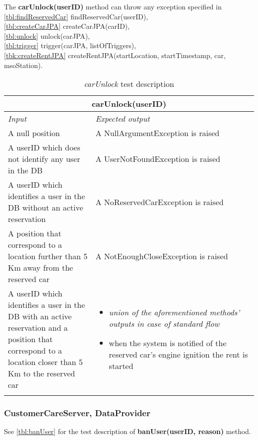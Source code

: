 \clearpage

The \textbf{carUnlock(userID)} method can throw any exception specified in \\\autoref{tbl:findReservedCar} findReservedCar(userID), \\\autoref{tbl:createCarJPA} createCarJPA(carID), \\\autoref{tbl:unlock} unlock(carJPA), \\\autoref{tbl:trigger} trigger(carJPA, listOfTriggers), \\\autoref{tbk:createRentJPA} createRentJPA(startLocation, startTimestamp, car, msoStation).
\begin{longtable}{p{0.35\linewidth}p{0.65\linewidth}}
\multicolumn{2}{c}{\textbf{carUnlock(userID)}} \\
\toprule
\emph{Input} & \emph{Expected output} \\
\midrule
A null position & A NullArgumentException is raised \\
\midrule
A userID which does not identify any user in the DB & A UserNotFoundException is raised\\
\midrule
A userID which identifies a user in the DB without an active reservation & A NoReservedCarException is raised \\
\midrule
A position that correspond to a location further than 5 Km away from the reserved car & A NotEnoughCloseException is raised \\
\midrule
A userID which identifies a user in the DB with an active reservation and a position that correspond to a location closer than 5 Km to the reserved car & \begin{itemize}
	\item \emph{union of the aforementioned methods' \mbox{outputs} in case of standard flow}
	\item when the system is notified of the reserved car's engine ignition the rent is started
	\end{itemize}
\\
\bottomrule
\caption{\emph{carUnlock} test description}
\end{longtable}

\subsubsection{CustomerCareServer, DataProvider}
See \autoref{tbl:banUser} for the test description of \textbf{banUser(userID, reason)} method.

